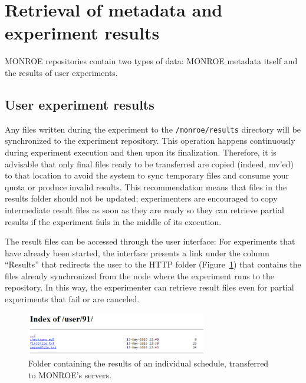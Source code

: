 \documentclass[a4paper,10pt]{article}
\newcommand{\monroe}{MONROE}
\newcommand{\identifier}[1]{{\texttt{\small{#1}}}}
\begin{document}
\section{Retrieval of metadata and experiment results}
\label{sec:resultRetrieval}

\monroe{} repositories contain two types of data: \monroe{} metadata itself and the results of user experiments.

\subsection{User experiment results}

Any files written during the experiment to the \identifier{/monroe/results} directory will be synchronized to the experiment repository.
This operation happens continuously during experiment execution and then upon its finalization.
Therefore, it is advisable that only final files ready to be transferred are copied (indeed, mv'ed) to that location to avoid the system to sync temporary files and consume your quota or produce invalid results.
This recommendation means that files in the results folder should not be updated; experimenters are encouraged to copy intermediate result files as soon as they are ready so they can retrieve partial results if the experiment fails in the middle of its execution.

The result files can be accessed through the user interface:
For experiments that have already been started, the interface presents a link under the column ``Results'' that redirects the user to the HTTP folder (Figure~\ref{fig:ResultsRetrieval}) that contains the files already synchronized from the node where the experiment runs to the repository.
In this way, the experimenter can retrieve result files even for partial experiments that fail or are canceled.

\begin{figure}[tp]
	\centering
	\includegraphics[width=0.7\textwidth]{ResultsRetrieval.png}
	\caption{Folder containing the results of an individual schedule, transferred to \monroe{}'s servers.}
	\label{fig:ResultsRetrieval}
	\end{figure}
\end{document}

